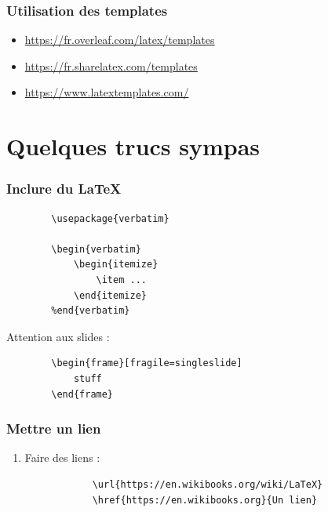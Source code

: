 \documentclass[handout]{beamer}
\begin{document}
\begin{frame}
	\frametitle{Utilisation des templates}

	\centering
	\Huge
	\normalsize

	\hspace{2cm}

	\begin{itemize}
		\item \url{https://fr.overleaf.com/latex/templates}
		\item \url{https://fr.sharelatex.com/templates}
		\item \url{https://www.latextemplates.com/}
	\end{itemize}
\end{frame}

\section{Quelques trucs sympas}

\begin{frame}[fragile=singleslide]
	\frametitle{Inclure du \LaTeX}

	\centering

	\begin{verbatim}
		\usepackage{verbatim}

		\begin{verbatim}
			\begin{itemize}
				\item ...
			\end{itemize}
		%end{verbatim}

	\end{verbatim}

	Attention aux slides :\\
	\begin{verbatim}
		\begin{frame}[fragile=singleslide]
			stuff
		\end{frame}
	\end{verbatim}

\end{frame}

\begin{frame}[fragile=singleslide]
	\frametitle{Mettre un lien}

	\begin{enumerate}
		\item Faire des liens :\\
			\begin{verbatim}
			\url{https://en.wikibooks.org/wiki/LaTeX}
			\href{https://en.wikibooks.org}{Un lien}
			\end{verbatim}
	\end{enumerate}
\end{frame}
\end{document}
